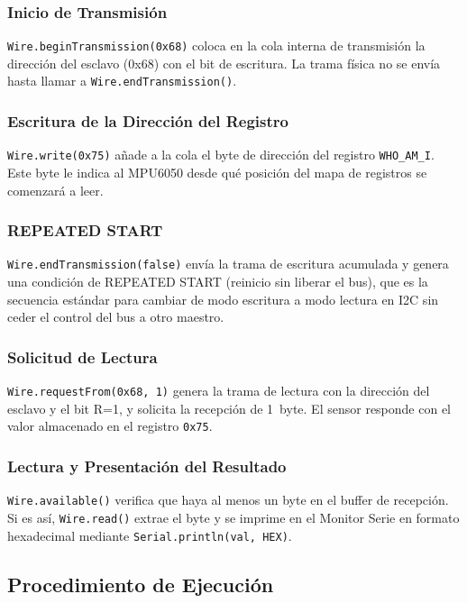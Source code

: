 \documentclass[10pt,twocolumn,a4paper]{article}
\begin{document}
\subsubsection{Inicio de Transmisión}
\texttt{Wire.beginTransmission(0x68)} coloca en la cola interna de
transmisión la dirección del esclavo (0x68) con el bit de escritura.
La trama física no se envía hasta llamar a \texttt{Wire.endTransmission()}.

\subsubsection{Escritura de la Dirección del Registro}
\texttt{Wire.write(0x75)} añade a la cola el byte de dirección del
registro \texttt{WHO\_AM\_I}. Este byte le indica al MPU6050 desde qué
posición del mapa de registros se comenzará a leer.

\subsubsection{REPEATED START}
\texttt{Wire.endTransmission(false)} envía la trama de escritura
acumulada y genera una condición de REPEATED START (reinicio sin
liberar el bus), que es la secuencia estándar para cambiar de modo
escritura a modo lectura en I2C sin ceder el control del bus a otro
maestro.

\subsubsection{Solicitud de Lectura}
\texttt{Wire.requestFrom(0x68, 1)} genera la trama de lectura con la
dirección del esclavo y el bit R=1, y solicita la recepción de 1~byte.
El sensor responde con el valor almacenado en el registro \texttt{0x75}.

\subsubsection{Lectura y Presentación del Resultado}
\texttt{Wire.available()} verifica que haya al menos un byte en el
buffer de recepción. Si es así, \texttt{Wire.read()} extrae el byte y
se imprime en el Monitor Serie en formato hexadecimal mediante
\texttt{Serial.println(val, HEX)}.

\subsection{Procedimiento de Ejecución}
\end{document}
